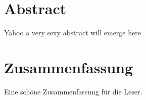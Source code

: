 \begingroup
\let\clearpage\relax
\let\cleardoublepage\relax
\let\cleardoublepage\relax

\chapter*{Abstract}
Yahoo a very sexy abstract will emerge here

%
\vfill

\pagebreak


\chapter*{Zusammenfassung}
Eine schöne Zusammenfassung für die Leser.



\endgroup

\vfill